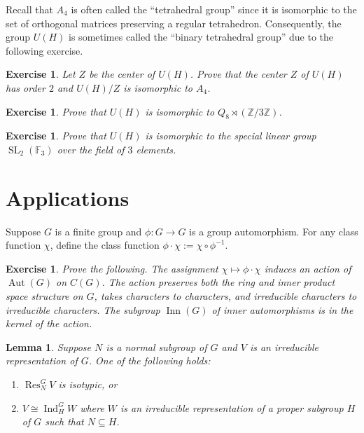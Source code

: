 \documentclass[12pt]{article}
\theoremstyle{plain}
\newtheorem{lemma}[theorem]{Lemma}
\newtheorem{exercise}[theorem]{Exercise}
\theoremstyle{definition}
\theoremstyle{remark}
\numberwithin{equation}{section}
\begin{document}
Recall that $A_4$ is often called the ``tetrahedral group''
since it is isomorphic to the set of orthogonal matrices preserving a
regular tetrahedron.
Consequently, the group $U(H)$ is sometimes called the ``binary tetrahedral group''
due to the following exercise.

\begin{exercise}
Let $Z$ be the center of $U(H)$.
Prove that the center $Z$ of $U(H)$ has order $2$ and
$U(H)/Z $ is isomorphic to $A_4$.
\end{exercise}


\begin{exercise}
Prove that $U(H)$ is isomorphic to $Q_8 \rtimes (\mathbb{Z}/3\mathbb{Z})$.
\end{exercise}

\begin{exercise}
Prove that $U(H)$ is isomorphic to the special linear group
$\operatorname{SL}_2(\mathbb{F}_3)$ over the field of $3$ elements.
\end{exercise}

\section{Applications}

Suppose $G$ is a finite group and $\phi: G \to G$
is a group automorphism.  For any class function $\chi$,
define the class function $\phi \cdot \chi := \chi \circ \phi^{-1}$.

\begin{exercise}
Prove the following.
The assignment $\chi \mapsto \phi \cdot \chi$ induces an action
of $\operatorname{Aut}(G)$ on $C(G)$.
The action preserves both the ring and inner product space structure on
$G$, takes characters to characters,
and irreducible characters to irreducible characters.
The subgroup $\operatorname{Inn}(G)$ of inner automorphisms is in the
kernel of the action.
\end{exercise}

\begin{lemma} \label{lem:normal_restriction}
Suppose $N$ is a normal subgroup of $G$ and $V$
is an irreducible representation of $G$.  One of the following holds:
\begin{enumerate}
\item $\operatorname{Res}^G_N V$ is isotypic, or
\item $V \cong \operatorname{Ind}^G_H W$ where $W$ is an irreducible
representation of a proper subgroup $H$ of $G$ such that $N
\subseteq H$.
\end{enumerate}
\end{lemma}
\end{document}
